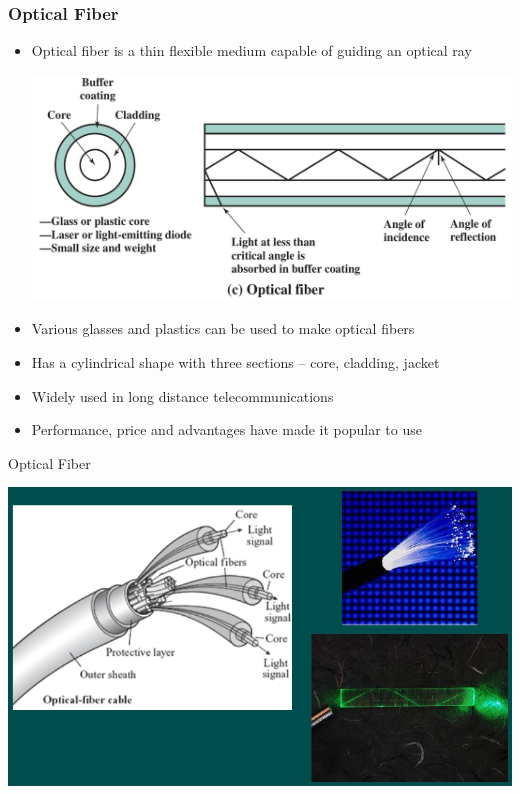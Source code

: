 \documentclass[pdflatex,compress]{beamer}
\begin{document}
\begin{frame}
	\frametitle{Optical Fiber}
	\begin{itemize}
		\item Optical fiber is a thin flexible medium capable of guiding an optical ray
		\begin{center}
			\includegraphics[width=0.5\linewidth]{img/img05}
		\end{center}
		\item Various glasses and plastics can be used to make optical fibers
		\item Has a cylindrical shape with three sections – core, cladding, jacket
		\item Widely used in long distance telecommunications
		\item Performance, price and advantages have made it popular to use
	\end{itemize}
\end{frame}

\begin{frame}{Optical Fiber}
	\begin{center}
		\includegraphics[width=\linewidth]{img/img13}
	\end{center}
\end{frame}
\end{document}
